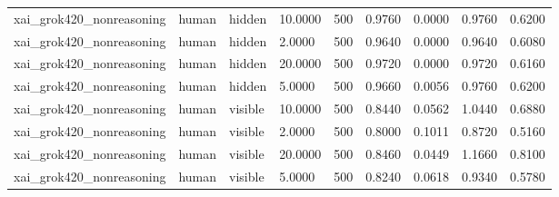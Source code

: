 \begin{tabular}{lllllllll}
xai\_grok420\_nonreasoning & human & hidden & 10.0000 & 500 & 0.9760 & 0.0000 & 0.9760 & 0.6200 \\
xai\_grok420\_nonreasoning & human & hidden & 2.0000 & 500 & 0.9640 & 0.0000 & 0.9640 & 0.6080 \\
xai\_grok420\_nonreasoning & human & hidden & 20.0000 & 500 & 0.9720 & 0.0000 & 0.9720 & 0.6160 \\
xai\_grok420\_nonreasoning & human & hidden & 5.0000 & 500 & 0.9660 & 0.0056 & 0.9760 & 0.6200 \\
xai\_grok420\_nonreasoning & human & visible & 10.0000 & 500 & 0.8440 & 0.0562 & 1.0440 & 0.6880 \\
xai\_grok420\_nonreasoning & human & visible & 2.0000 & 500 & 0.8000 & 0.1011 & 0.8720 & 0.5160 \\
xai\_grok420\_nonreasoning & human & visible & 20.0000 & 500 & 0.8460 & 0.0449 & 1.1660 & 0.8100 \\
xai\_grok420\_nonreasoning & human & visible & 5.0000 & 500 & 0.8240 & 0.0618 & 0.9340 & 0.5780 \\
\bottomrule
\end{tabular}
